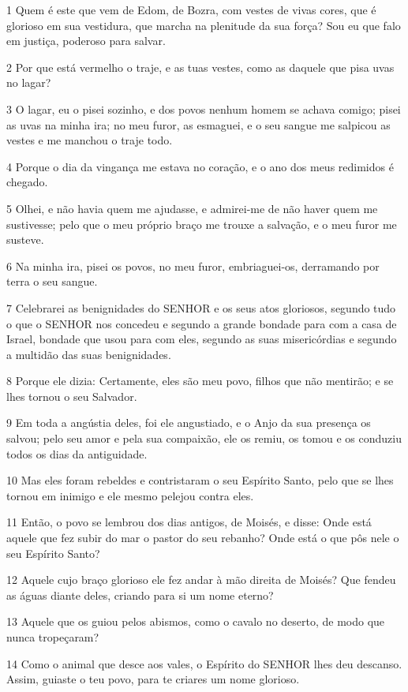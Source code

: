 \par 1 Quem é este que vem de Edom, de Bozra, com vestes de vivas cores, que é glorioso em sua vestidura, que marcha na plenitude da sua força? Sou eu que falo em justiça, poderoso para salvar.
\par 2 Por que está vermelho o traje, e as tuas vestes, como as daquele que pisa uvas no lagar?
\par 3 O lagar, eu o pisei sozinho, e dos povos nenhum homem se achava comigo; pisei as uvas na minha ira; no meu furor, as esmaguei, e o seu sangue me salpicou as vestes e me manchou o traje todo.
\par 4 Porque o dia da vingança me estava no coração, e o ano dos meus redimidos é chegado.
\par 5 Olhei, e não havia quem me ajudasse, e admirei-me de não haver quem me sustivesse; pelo que o meu próprio braço me trouxe a salvação, e o meu furor me susteve.
\par 6 Na minha ira, pisei os povos, no meu furor, embriaguei-os, derramando por terra o seu sangue.
\par 7 Celebrarei as benignidades do SENHOR e os seus atos gloriosos, segundo tudo o que o SENHOR nos concedeu e segundo a grande bondade para com a casa de Israel, bondade que usou para com eles, segundo as suas misericórdias e segundo a multidão das suas benignidades.
\par 8 Porque ele dizia: Certamente, eles são meu povo, filhos que não mentirão; e se lhes tornou o seu Salvador.
\par 9 Em toda a angústia deles, foi ele angustiado, e o Anjo da sua presença os salvou; pelo seu amor e pela sua compaixão, ele os remiu, os tomou e os conduziu todos os dias da antiguidade.
\par 10 Mas eles foram rebeldes e contristaram o seu Espírito Santo, pelo que se lhes tornou em inimigo e ele mesmo pelejou contra eles.
\par 11 Então, o povo se lembrou dos dias antigos, de Moisés, e disse: Onde está aquele que fez subir do mar o pastor do seu rebanho? Onde está o que pôs nele o seu Espírito Santo?
\par 12 Aquele cujo braço glorioso ele fez andar à mão direita de Moisés? Que fendeu as águas diante deles, criando para si um nome eterno?
\par 13 Aquele que os guiou pelos abismos, como o cavalo no deserto, de modo que nunca tropeçaram?
\par 14 Como o animal que desce aos vales, o Espírito do SENHOR lhes deu descanso. Assim, guiaste o teu povo, para te criares um nome glorioso.
